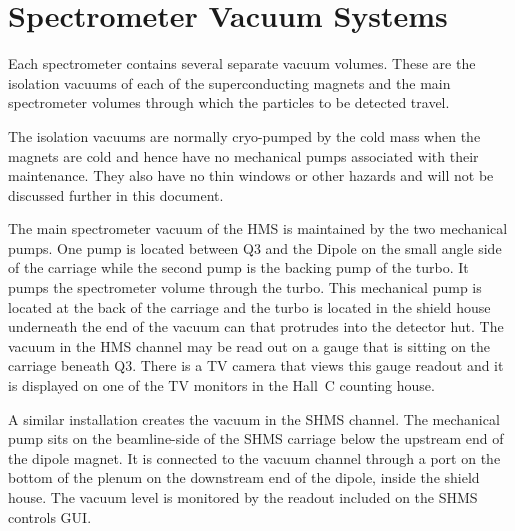 %
%

\section{Spectrometer Vacuum Systems}

	Each spectrometer contains several separate vacuum volumes.
These are the isolation vacuums of each of the superconducting
magnets and the main spectrometer volumes through which the particles
to be detected travel.

The isolation vacuums are normally cryo-pumped by the cold mass when the
magnets are cold and hence have no mechanical pumps
associated with their maintenance. They also have no thin
windows or other hazards and will not be discussed further in this document.

The main spectrometer vacuum of the HMS
is maintained by the two mechanical pumps.
One pump is located between Q3 and the Dipole on the small angle
side of the carriage while the second pump is the backing
pump of the turbo. It pumps the spectrometer volume through the turbo.
This mechanical pump is located
at the back of the carriage and the turbo is located in the shield house
underneath the end of the vacuum can that protrudes into the detector hut.
The vacuum in the HMS channel may be read out on a gauge that is sitting on the
carriage beneath Q3. There is a TV camera that views this gauge readout and
it is displayed on one of the TV monitors  in the Hall~C counting house. 

A similar installation creates the vacuum in the SHMS channel. The mechanical
pump sits on the beamline-side of the SHMS carriage below the
upstream end of the dipole magnet. It is connected to the vacuum channel
through a port on the bottom of the plenum on the downstream end of the
dipole, inside the shield house. The vacuum level is monitored by the
readout included on the SHMS controls GUI.

